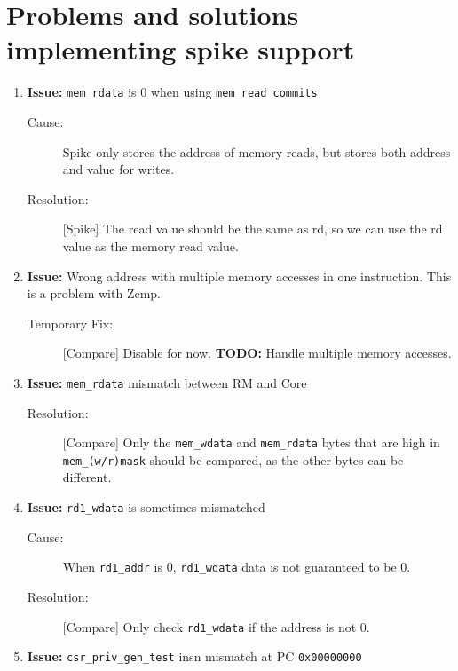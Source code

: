 \chapter{Problems and solutions implementing spike support}

\begin{enumerate}

\item \textbf{Issue:} \lstinline{mem_rdata} is 0 when using \lstinline{mem_read_commits}
  \begin{description}
    \item[Cause:] Spike only stores the address of memory reads, but stores both address and value for writes.
    \item[Resolution:] [Spike] The read value should be the same as rd, so we can use the rd value as the memory read value.
  \end{description}

\item \textbf{Issue:} Wrong address with multiple memory accesses in one instruction. This is a problem with Zcmp.
  \begin{description}
    \item[Temporary Fix:] [Compare] Disable for now. \textbf{TODO:} Handle multiple memory accesses.
  \end{description}

\item \textbf{Issue:} \lstinline{mem_rdata} mismatch between RM and Core
  \begin{description}
    \item[Resolution:] [Compare] Only the \lstinline{mem_wdata} and \lstinline{mem_rdata} bytes that are high in \lstinline{mem_(w/r)mask} should be compared, as the other bytes can be different.
  \end{description}

\item \textbf{Issue:} \lstinline{rd1_wdata} is sometimes mismatched
  \begin{description}
    \item[Cause:] When \lstinline{rd1_addr} is 0, \lstinline{rd1_wdata} data is not guaranteed to be 0.
    \item[Resolution:] [Compare] Only check \lstinline{rd1_wdata} if the address is not 0.
  \end{description}

\item \textbf{Issue:} \lstinline{csr_priv_gen_test} insn mismatch at PC \lstinline{0x00000000}


\end{enumerate}
